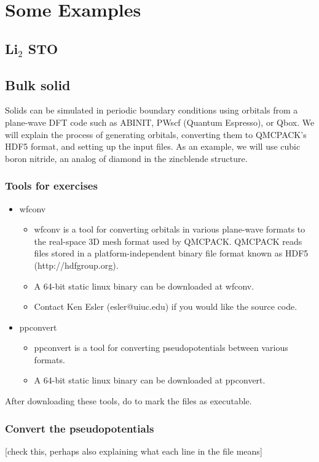 \chapter{Some Examples}
\section{Li${}_2$ STO}
\section{Bulk solid}
Solids can be simulated in periodic boundary conditions using orbitals from a plane-wave DFT code such as ABINIT, PWscf (Quantum Espresso), or Qbox.  We will explain the process of generating orbitals, converting them to QMCPACK's HDF5 format, and setting up the input files. As an example, we will use cubic boron nitride, an analog of diamond in the zincblende structure.

\subsection*{Tools for exercises}
\begin{itemize}
  \item{} wfconv
  \begin{itemize}
    \item{} wfconv is a tool for converting orbitals in various plane-wave formats to the real-space 3D mesh format used by QMCPACK. QMCPACK reads files stored in a platform-independent binary file format known as HDF5 (http://hdfgroup.org).
    \item{} A 64-bit static linux binary can be downloaded at wfconv.
    \item{} Contact Ken Esler (esler@uiuc.edu) if you would like the source code. 
  \end{itemize}
  \item{} ppconvert
  \begin{itemize}
    \item{} ppconvert is a tool for converting pseudopotentials between various formats.
    \item{} A 64-bit static linux binary can be downloaded at ppconvert. 
  \end{itemize}
\end{itemize}

After downloading these tools, do  to mark the files as executable.

\subsection*{Convert the pseudopotentials}
[check this, perhaps also explaining what each line in the file means]

